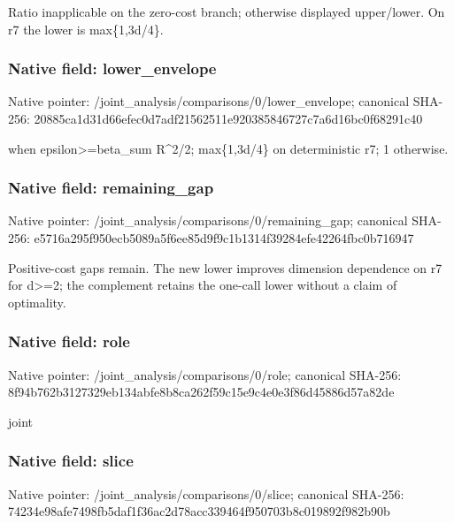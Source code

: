 \documentclass[10pt,a4paper]{article}
\begin{document}
\begingroup\raggedright\sloppy Ratio inapplicable on the zero-cost branch;\allowbreak{} otherwise displayed upper/\allowbreak{}lower. On r7 the lower is max\{1,\allowbreak{}3d/\allowbreak{}4\}.\par\endgroup

\subsubsection{Native field: lower\_\allowbreak{}envelope}
Native pointer: /joint\_\allowbreak{}analysis/comparisons/0/lower\_\allowbreak{}envelope; canonical SHA-256: 20885ca1d31d66efec0d7adf21562511e920385846727c7a6d16bc0f68291c40

\begingroup\raggedright{} when epsilon>=\allowbreak{}beta\_\allowbreak{}sum R\textasciicircum{}2/\allowbreak{}2;\allowbreak{} max\{1,\allowbreak{}3d/\allowbreak{}4\} on deterministic r7;\allowbreak{} 1 otherwise.\par\endgroup

\subsubsection{Native field: remaining\_\allowbreak{}gap}
Native pointer: /joint\_\allowbreak{}analysis/comparisons/0/remaining\_\allowbreak{}gap; canonical SHA-256: e5716a295f950ecb5089a5f6ee85d9f9c1b1314f39284efe42264fbc0b716947

\begingroup\raggedright\sloppy Positive-cost gaps remain. The new lower improves dimension dependence on r7 for d>=\allowbreak{}2;\allowbreak{} the complement retains the one-call lower without a claim of optimality.\par\endgroup

\subsubsection{Native field: role}
Native pointer: /joint\_\allowbreak{}analysis/comparisons/0/role; canonical SHA-256: 8f94b762b3127329eb134abfe8b8ca262f59c15e9c4e0e3f86d45886d57a82de

\begingroup\raggedright\sloppy joint\par\endgroup

\subsubsection{Native field: slice}
Native pointer: /joint\_\allowbreak{}analysis/comparisons/0/slice; canonical SHA-256: 74234e98afe7498fb5daf1f36ac2d78acc339464f950703b8c019892f982b90b
\end{document}
